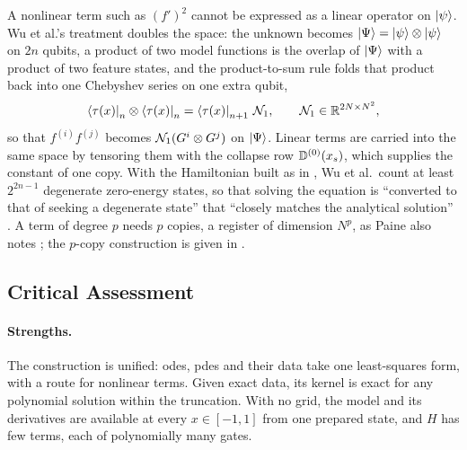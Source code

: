 A nonlinear term such as $(f')^2$ cannot be expressed as a linear operator on $\ket{\psi}$. Wu et al.'s treatment doubles the space: the unknown becomes $\ket{\Psi}=\ket{\psi}\otimes\ket{\psi}$ on $2n$ qubits, a product of two model functions is the overlap of $\ket{\Psi}$ with a product of two feature states, and the product-to-sum rule folds that product back into one Chebyshev series on one extra qubit,
\begin{equation}
    \bra{\tau(x)}_n\otimes\bra{\tau(x)}_n=\bra{\tau(x)}_{n+1}\,\mathcal{N}_1, \qquad \mathcal{N}_1\in\mathbb{R}^{2N\times N^2},
    \label{eq:pihm-fold}
\end{equation}
so that $f^{(i)}f^{(j)}$ becomes $\mathcal{N}_1(G^{i}\otimes G^{j})$ on $\ket{\Psi}$. Linear terms are carried into the same space by tensoring them with the collapse row $\mathbb{D}^{(0)}(x_s)$, which supplies the constant of one copy. With the Hamiltonian built as in , Wu et al.\ count at least $2^{2n-1}$ degenerate zero-energy states, so that solving the equation is ``converted to that of seeking a degenerate state'' that ``closely matches the analytical solution'' \cite{wu2025pihm}. A term of degree $p$ needs $p$ copies, a register of dimension $N^p$, as Paine also notes \cite{paine2026concurrent}; the $p$-copy construction is given in .

\subsection{Critical Assessment}
\label{sec:pihm-assessment}

\paragraph{Strengths.} The construction is unified: \glspl{ode}, \glspl{pde} and their data take one least-squares form, with a route for nonlinear terms. Given exact data, its kernel is exact for any polynomial solution within the truncation. With no grid, the model and its derivatives are available at every $x\in[-1,1]$ from one prepared state, and $H$ has few terms, each of polynomially many gates.

